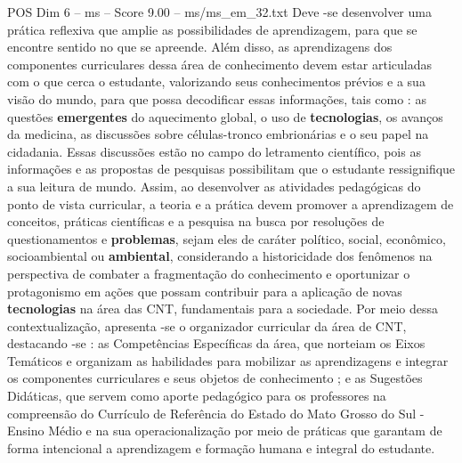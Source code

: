 \begin{textsample}{POS Dim 6 – ms – Score 9.00 – ms/ms\_em\_32.txt}
Deve -se desenvolver uma prática reflexiva que amplie as possibilidades de aprendizagem, para que se encontre sentido no que se apreende.
Além disso, as aprendizagens dos componentes curriculares dessa área de conhecimento devem estar articuladas com o que cerca o estudante, valorizando seus conhecimentos prévios e a sua visão do mundo, para que possa decodificar essas informações, tais como : as questões \textbf{emergentes} do aquecimento global, o uso de \textbf{tecnologias}, os avanços da medicina, as discussões sobre células-tronco embrionárias e o seu papel na cidadania.
Essas discussões estão no campo do letramento científico, pois as informações e as propostas de pesquisas possibilitam que o estudante ressignifique a sua leitura de mundo.
Assim, ao desenvolver as atividades pedagógicas do ponto de vista curricular, a teoria e a prática devem promover a aprendizagem de conceitos, práticas científicas e a pesquisa na busca por resoluções de questionamentos e \textbf{problemas}, sejam eles de caráter político, social, econômico, socioambiental ou \textbf{ambiental}, considerando a historicidade dos fenômenos na perspectiva de combater a fragmentação do conhecimento e oportunizar o protagonismo em ações que possam contribuir para a aplicação de novas \textbf{tecnologias} na área das CNT, fundamentais para a sociedade.
Por meio dessa contextualização, apresenta -se o organizador curricular da área de CNT, destacando -se : as Competências Específicas da área, que norteiam os Eixos Temáticos e organizam as habilidades para mobilizar as aprendizagens e integrar os componentes curriculares e seus objetos de conhecimento ; e as Sugestões Didáticas, que servem como aporte pedagógico para os professores na compreensão do Currículo de Referência do Estado do Mato Grosso do Sul - Ensino Médio e na sua operacionalização por meio de práticas que garantam de forma intencional a aprendizagem e formação humana e integral do estudante.

\end{textsample}
